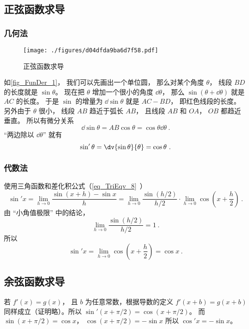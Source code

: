 \subsection{正弦函数求导}
\subsubsection{几何法}
\begin{figure}[ht]
\centering
\texttt{[image: ./figures/d04dfda9ba6d7f58.pdf]}
\caption{正弦函数求导} \label{fig_FunDer_1}
\end{figure}
如\autoref{fig_FunDer_1}， 我们可以先画出一个单位圆， 那么对某个角度 $\theta$， 线段 $BD$ 的长度就是 $\sin\theta$。 现在把 $\theta$ 增加一个很小的角度 $\dd{\theta}$， 那么 $\sin(\theta+\dd{\theta})$ 就是 $AC$ 的长度。 于是 $\sin$ 的增量为 $\dd{\sin\theta}$ 就是 $AC - BD$， 即红色线段的长度。 另外由于 $\theta$ 很小， 线段 $AB$ 趋近于弧长 $AB$， 且线段 $AB$ 和 $OA$， $OB$ 都趋近垂直。 所以有微分关系
\begin{equation}
\dd{\sin\theta} = AB \cos\theta = \cos\theta \dd{\theta}~.
\end{equation}
“两边除以 $\dd{\theta}$” 就有
\begin{equation}
\sin'\theta = \dv{\sin\theta}{\theta} = \cos\theta~.
\end{equation}

\subsubsection{代数法}
使用三角函数和差化积公式（\autoref{eq_TriEqv_8}~）
\begin{equation}
\sin'x = \lim_{h \to 0} \frac{\sin (x + h) - \sin x}{h} = \lim_{h \to 0} \frac{\sin (h/2)}{h/2} \cdot \lim_{h \to 0}\cos( x + \frac{h}{2})~.
\end{equation}
由 “小角值极限” 中的结论，
\begin{equation}
\lim_{h \to 0} \frac{\sin (h/2)}{h/2} = 1~.
\end{equation}
所以
\begin{equation}
\sin'x =  \lim_{h \to 0}\cos( x + \frac{h}{2}) = \cos x~.
\end{equation}

\subsection{余弦函数求导}
若 $f'(x) = g(x)$， 且 $b$ 为任意常数，根据导数的定义 $f'(x + b) = g(x + b)$ 同样成立（证明略）。所以 $\sin'(x + \pi/2) = \cos(x + \pi/2)$。 而 $\sin(x + \pi/2) = \cos x$，  $\cos(x + \pi/2) =  - \sin x$ 所以 $\cos' x =  - \sin x$。

